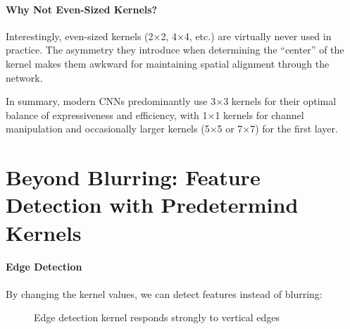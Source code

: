 \documentclass{article}
\begin{document}
\paragraph{Why Not Even-Sized Kernels?}

Interestingly, even-sized kernels (2×2, 4×4, etc.) are virtually never used in practice. The asymmetry they introduce when determining the ``center'' of the kernel makes them awkward for maintaining spatial alignment through the network.

In summary, modern CNNs predominantly use 3×3 kernels for their optimal balance of expressiveness and efficiency, with 1×1 kernels for channel manipulation and occasionally larger kernels (5×5 or 7×7) for the first layer.




\section{Beyond Blurring: Feature Detection with Predetermind Kernels}\label{app:CV}

\paragraph{Edge Detection}

By changing the kernel values, we can detect features instead of blurring:

\begin{figure}[h]
\centering
{}
\caption{Edge detection kernel responds strongly to vertical edges}
\end{figure}
\end{document}
